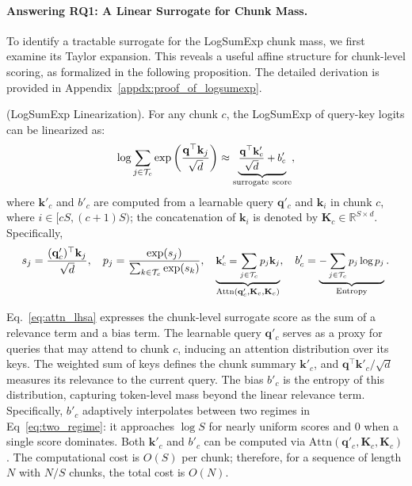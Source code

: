 \paragraph{Answering RQ1: A Linear Surrogate for Chunk Mass.}
To identify a tractable surrogate for the LogSumExp chunk mass, we first examine its Taylor expansion. This reveals a useful affine structure for chunk-level scoring, as formalized in the following proposition.
The detailed derivation is provided in Appendix~\ref{appdx:proof_of_logsumexp}.
\begin{proposition} \label{prop:logsumexp} (LogSumExp Linearization). 
For any chunk $c$, the LogSumExp of query-key logits can be linearized as:
\begin{equation}
\small
    \log \sum_{j \in \mathcal{T}_c} 
    \exp\left(\frac{\mathbf{q}^\top\mathbf{k}_j}{\sqrt d}\right) 
    \approx 
    \underbrace{\frac{\mathbf{q}^\top \mathbf{k}'_c}{\sqrt{d}} + b'_c}_{\mathrm{surrogate~score}},
    \label{eq:attn_lhsa}
\end{equation}
where $\mathbf{k}'_c$ and $b'_c$ are computed from a learnable query $\mathbf{q}'_c$ and $\mathbf{k}_i$ in chunk $c$, where $i \in [cS,(c+1)S)$; the concatenation of $\mathbf{k}_i$ is denoted by $\mathbf{K}_c \in \mathbb{R}^{S\times d}$. Specifically,
\begin{equation}
\small
    s_j=\frac{(\mathbf{q}'_{c})^{\top} \mathbf{k}_j}{\sqrt{d}},
    \quad 
    p_j = \frac{\exp(s_j)}{\sum_{k \in \mathcal{T}_c} \exp(s_k)},
    \quad
    \underbrace{\mathbf{k}'_c = \sum_{j \in \mathcal{T}_c} p_j \mathbf{k}_j}_{\mathrm{Attn}(\mathbf{q}'_c,\mathbf{K}_c,\mathbf{K}_c)},
    \quad 
    b'_c = 
    \underbrace{-\sum_{j\in \mathcal{T}_c} p_j \log p_j}_{\mathrm{Entropy}}.
    \label{eq:prop_q_c}
\end{equation}
\end{proposition}
Eq.~\eqref{eq:attn_lhsa} expresses the chunk-level surrogate score as the sum of a relevance term and a bias term. The learnable query $\mathbf{q}'_c$ serves as a proxy for queries that may attend to chunk $c$, inducing an attention distribution over its keys. 
The weighted sum of keys defines the chunk summary $\mathbf{k}'_c$, and $\mathbf{q}^{\top}\mathbf{k}'_c/\sqrt d$ measures its relevance to the current query. 
The bias $b'_c$ is the entropy of this distribution, capturing token-level mass beyond the linear relevance term. Specifically, $b'_c$ adaptively interpolates between two regimes in Eq~\eqref{eq:two_regime}: it approaches $\log S$ for nearly uniform scores and $0$ when a single score dominates. 
Both $\mathbf{k}'_c$ and $b'_c$ can be computed via $\mathrm{Attn}(\mathbf{q}'_c,\mathbf{K}_c,\mathbf{K}_c)$. 
The computational cost is $O(S)$ per chunk; therefore, for a sequence of length $N$ with $N/S$ chunks, the total cost is $O(N)$.


